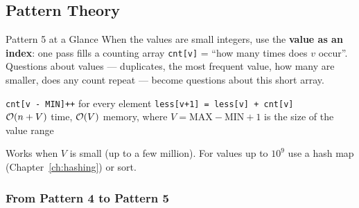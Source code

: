 \subsection{Pattern Theory}
\label{ssec:ch1-p5-theory}

\begin{patternbox}{Pattern 5 at a Glance}
When the values are small integers, use the \textbf{value as an index}: one pass fills a counting array \texttt{cnt[v]} = ``how many times does $v$ occur''. Questions about values --- duplicates, the most frequent value, how many are smaller, does any count repeat --- become questions about this short array.

\begin{center}
\end{center}

\begin{recurrencebox}
\centering
\texttt{cnt[v - MIN]++} for every element \qquad\quad \texttt{less[v+1] = less[v] + cnt[v]}\\[3pt]
$\mathcal{O}(n + V)$ time, $\mathcal{O}(V)$ memory, where $V = \text{MAX} - \text{MIN} + 1$ is the size of the value range
\end{recurrencebox}
Works when $V$ is small (up to a few million). For values up to $10^9$ use a hash map (Chapter~\ref{ch:hashing}) or sort.
\end{patternbox}

\subsubsection*{From Pattern 4 to Pattern 5}

